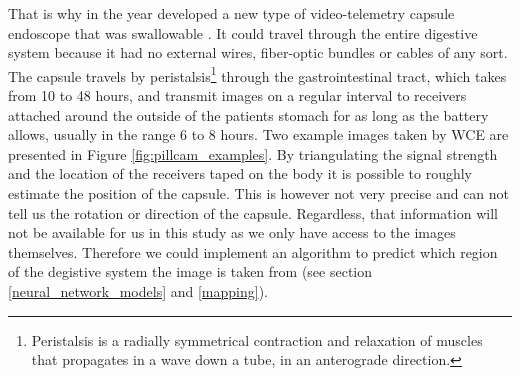 \documentclass[english, a4paper]{article}
\begin{document}



That is why in the year \citeyear{WirelessCapsule00} \citeauthor*{WirelessCapsule00} developed a new type of video-telemetry capsule endoscope that was swallowable \cite{WirelessCapsule00}. It could travel through the entire digestive system because it had no external wires, fiber-optic bundles or cables of any sort. The capsule travels by peristalsis\footnote{Peristalsis is a radially symmetrical contraction and relaxation of muscles that propagates in a wave down a tube, in an anterograde direction.} through the gastrointestinal tract, which takes from 10 to 48 hours, and transmit images on a regular interval to receivers attached around the outside of the patients stomach for as long as the battery allows, usually in the range 6 to 8 hours. Two example images taken by WCE are presented in Figure \ref{fig:pillcam_examples}. By triangulating the signal strength and the location of the receivers taped on the body it is possible to roughly estimate the position of the capsule. This is however not very precise and can not tell us the rotation or direction of the capsule. Regardless, that information will not be available for us in this study as we only have access to the images themselves. Therefore we could implement an algorithm to predict which region of the degistive system the image is taken from (see section \ref{neural_network_models} and \ref{mapping}).
\end{document}
